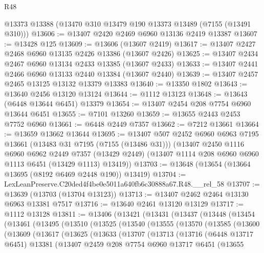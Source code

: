 \begin{lexlean}{R48}
\begin{coremodule}
    @13373
    @13388
    (@13470 @310 @13479 @190 @13373 @13489 (@7155 (@13491 @310)))
@13606 := @13407 @2420 @2469 @6960 @13136 @2419 @13387
@13607 := @13428 @125
@13609 := @13606 (@13607 @2419)
@13617 := @13407 @2427 @2468 @6960 @13135 @2426 @13386 (@13607 @2426)
@13625 := @13407 @2434 @2467 @6960 @13134 @2433 @13385 (@13607 @2433)
@13633 := @13407 @2441 @2466 @6960 @13133 @2440 @13384 (@13607 @2440)
@13639 := @13407 @2457 @2465 @13125 @13132 @13379 @13383
@13640 := @13350 @1802
@13643 := @13640 @2456 @13120 @13124
@13644 := @1112 @13123
@13648 := @13643 (@6448 @13644 @6451) @13379
@13654 := @13407 @2454 @208 @7754 @6960 @13644 @6451
@13655 := @7101 @13260
@13659 := @13655 @2443 @2453 @7752 @6960
@13661 := @6448 @2449 @7357
@13662 := @7212 @13661
@13664 := @13659 @13662 @13644
@13695 := @13407
    @507
    @2452
    @6960
    @6963
    @7195
    @13661
    (@13483 @31 @7195 (@7155 (@13486 @31)))
    (@13407
      @2450
      @1116
      @6960
      @6962
      @2449
      @7357
      (@13429 @2449)
      (@13407 @1114 @208 @6960 @6960 @1113 @6451 (@13429 @1113) @13419))
@13703 := @13648 (@13654 (@13664 @13695 (@8192 @6469 @2448 @190)) @13419)
@13704 := LexLeanPreserve.C20ded4f4be0e5011a640fb6c30888a67.R48.__rel_58
@13707 := @13639 (@13703 (@13704 @13123))
@13713 := @13407 @2462 @2464 @13130 @6963 @13381 @7517
@13716 := @13640 @2461 @13120 @13129
@13717 := @1112 @13128
@13811 := @13406
    (@13421
      (@13431
        (@13437
          (@13448
            (@13454
              (@13461
                (@13495
                  (@13510
                    (@13525
                      (@13540
                        (@13555
                          (@13570
                            (@13585
                              (@13600
                                (@13609
                                  (@13617
                                    (@13625
                                      (@13633
                                        (@13707
                                          (@13713
                                            (@13716
                                              (@6448 @13717 @6451)
                                              @13381
                                              (@13407
                                                @2459
                                                @208
                                                @7754
                                                @6960
                                                @13717
                                                @6451
                                                (@13655

\end{coremodule}
\end{lexlean}

